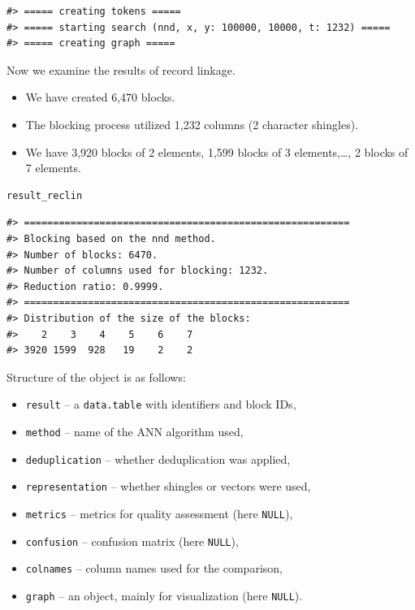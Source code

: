 \begin{verbatim}
#> ===== creating tokens =====
#> ===== starting search (nnd, x, y: 100000, 10000, t: 1232) =====
#> ===== creating graph =====
\end{verbatim}

Now we examine the results of record linkage.

\begin{itemize}
\tightlist
\item
  We have created 6,470 blocks.
\item
  The blocking process utilized 1,232 columns (2 character shingles).
\item
  We have 3,920 blocks of 2 elements, 1,599 blocks of 3 elements,\ldots, 2 blocks of 7 elements.
\end{itemize}

\begin{verbatim}
result_reclin
\end{verbatim}

\begin{verbatim}
#> ========================================================
#> Blocking based on the nnd method.
#> Number of blocks: 6470.
#> Number of columns used for blocking: 1232.
#> Reduction ratio: 0.9999.
#> ========================================================
#> Distribution of the size of the blocks:
#>    2    3    4    5    6    7 
#> 3920 1599  928   19    2    2
\end{verbatim}

Structure of the object is as follows:

\begin{itemize}
\tightlist
\item
  \texttt{result} -- a \texttt{data.table} with identifiers and block IDs,
\item
  \texttt{method} -- name of the ANN algorithm used,
\item
  \texttt{deduplication} -- whether deduplication was applied,
\item
  \texttt{representation} -- whether shingles or vectors were used,
\item
  \texttt{metrics} -- metrics for quality assessment (here \texttt{NULL}),
\item
  \texttt{confusion} -- confusion matrix (here \texttt{NULL}),
\item
  \texttt{colnames} -- column names used for the comparison,
\item
  \texttt{graph} -- an  object, mainly for visualization (here \texttt{NULL}).
\end{itemize}

